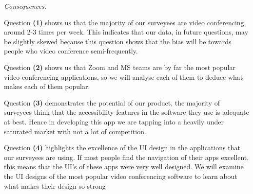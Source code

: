 
\vspace{1em}

\small

\textit{Consequences.} \\ \vspace{0.1cm}

Question \textbf{(1)} shows us that 
the majority of our surveyees are video conferencing around
2-3 times per week. This indicates that our data, in future 
questions, may be slightly skewed because this question shows 
that the bias will be towards people who video conference
semi-frequently. \\ \vspace{0.2cm}

Question \textbf{(2)} shows us that Zoom and MS teams are by 
far the most popular video conferencing applications, so we
will analyse each of them to deduce what makes each of them 
popular.\\ \vspace{0.2cm}

Question \textbf{(3)} demonstrates the potential of our 
product, the majority of surveyees think that the 
accessibility features in the software they use is adequate
at best. Hence in developing this app we are tapping into 
a heavily under saturated market with not a lot of 
competition. \\ \vspace{0.2cm}

Question \textbf{(4)} highlights the excellence of the UI
design in the applications that our surveyees are using. 
If most people find the navigation of their apps excellent,
this means that the UI's of these apps were very well
designed. We will examine the UI designs of the most
popular video conferencing software to learn about what
makes their design so strong \\ \vspace{0.2cm}

